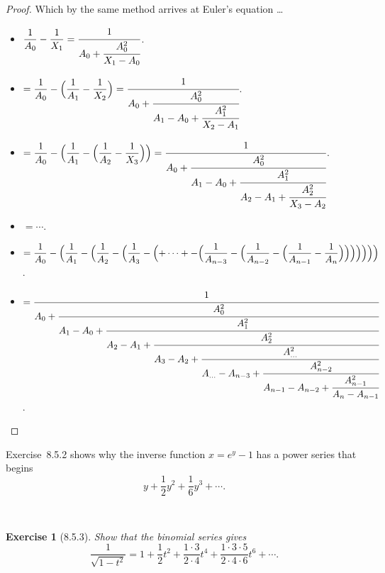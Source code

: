 \documentclass[12pt]{article}
\newcommand{\XB}{\color{black}}
\newcommand{\XBB}{\color{blue}}
\newcommand{\ds}{\displaystyle}
\theoremstyle{plain}
\newtheorem{ex}{Exercise}
\begin{document}
\begin{proof}
  Which by the same method arrives at Euler's equation \dots

  \begin{itemize}
    \item $ \ds \frac{1}{A_{0}} - \frac{1}{X_{1}} = \cfrac{1}{A_{0} + \cfrac{A_{0}^{2}}{X_{1} - A_{0}}} $.
    \item $ \ds = \frac{1}{A_{0}} - \Bigl( \frac{1}{A_{1}} - \frac{1}{X_{2}} \Bigr) = \cfrac{1}{A_{0} + \cfrac{A_{0}^{2}}{A_{1} - A_{0} + \cfrac{A_{1}^{2}}{X_{2} - A_{1}}}} $.
    \item $ \ds = \frac{1}{A_{0}} - \Bigl( \frac{1}{A_{1}} - \Bigl( \frac{1}{A_{2}} -  \frac{1}{X_{3}} \Bigr) \Bigr) = \cfrac{1}{A_{0} + \cfrac{A_{0}^{2}}{A_{1} - A_{0} + \cfrac{A_{1}^{2}}{A_{2} - A_{1} + \cfrac{A_{2}^{2}}{X_{3} - A_{2}}}}} $.
    \item $ \ds = \cdots $.
    \item $ \ds = \frac{1}{A_{0}} - \Bigl( \frac{1}{A_{1}} - \Bigl( \frac{1}{A_{2}} - \Bigl( \frac{1}{A_{3}} - \Bigl( + \cdots +- \Bigl( \frac{1}{A_{n-3}} - \Bigl( \frac{1}{A_{n-2}} - \Bigl(  \frac{1}{A_{n-1}} - \frac{1}{A_{n}} \Bigr) \Bigr) \Bigr) \Bigr) \Bigr) \Bigr) \Bigr) $.
    \item $ \ds = \cfrac{1}{A_{0} + \cfrac{A_{0}^{2}}{A_{1} - A_{0} + \cfrac{A_{1}^{2}}{A_{2} - A_{1} + \cfrac{A_{2}^{2}}{A_{3} - A_{2} + \cfrac{A_{\dots}^{2}}{A_{\dots} - A_{n - 3} + \cfrac{A_{n - 2}^{2}}{A_{n - 1} - A_{n - 2} + \cfrac{A_{n - 1}^{2}}{A_{n} - A_{n - 1}}}}}}}} $.
  \end{itemize}

\end{proof}

\newpage

Exercise~8.5.2 shows why the inverse function $ x = e^{y} - 1 $ has a power series that begins
\[
  y + \frac{1}{2}y^{2} + \frac{1}{6}y^{3} + \cdots.
\]


\XBB\hrulefill\XB \\
\begin{ex} [8.5.3]
  Show that the binomial series gives
  \[
    \frac{1}{\sqrt{1 - t^{2}}} = 1 + \frac{1}{2}t^{2} + \frac{1 \cdot 3}{2 \cdot 4}t^{4} + \frac{1 \cdot 3 \cdot 5}{2 \cdot 4 \cdot 6}t^{6} + \cdots.
  \]
\end{ex}
\XBB\hrulefill\XB \\
\end{document}
